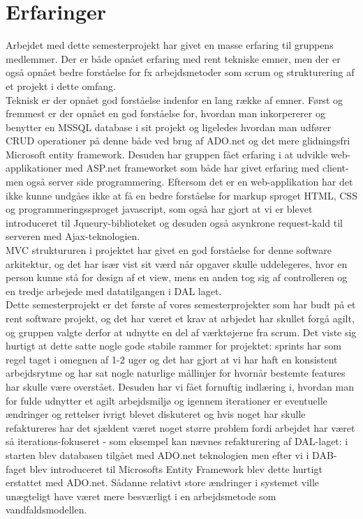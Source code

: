 \section{Erfaringer}
Arbejdet med dette semesterprojekt har givet en masse erfaring til gruppens medlemmer. Der er både opnået erfaring med rent tekniske emner, men der er også opnået bedre forståelse for fx arbejdsmetoder som scrum og strukturering af et projekt i dette omfang.\\
Teknisk er der opnået god forståelse indenfor en lang række af emner. Først og fremmest er der opnået en god forståelse for, hvordan man inkorpererer og benytter en MSSQL database i sit projekt og ligeledes hvordan man udfører CRUD operationer på denne både ved brug af ADO.net og det mere glidningsfri Microsoft entity framework. Desuden har gruppen fået erfaring i at udvikle web-applikationer med ASP.net frameworket som både har givet erfaring med client- men også server side programmering. Eftersom det er en web-applikation har det ikke kunne undgåes ikke at få en bedre forståelse for markup sproget HTML, CSS og programmeringssproget javascript, som også har gjort at vi er blevet introduceret til Jqueury-biblioteket og desuden også asynkrone request-kald til serveren med Ajax-teknologien.\\
MVC struktururen i projektet har givet en god forståelse for denne software arkitektur, og det har især vist sit værd når opgaver skulle uddelegeres, hvor en person kunne stå for design af et view, mens en anden tog sig af controlleren og en tredje arbejede med datatilgangen i DAL laget. 
\\
Dette semesterprojekt er det første af vores semesterprojekter som har budt på et rent software projekt, og det har været et krav at arbjedet har skullet forgå agilt, og gruppen valgte derfor at udnytte en del af værktøjerne fra scrum. Det viste sig hurtigt at dette satte nogle gode stabile rammer for projektet: sprints har som regel taget i omegnen af 1-2 uger og det har gjort at vi har haft en konsistent arbejdsrytme og har sat nogle naturlige mållinjer for hvornår bestemte features har skulle være overstået. Desuden har vi fået fornuftig indlæring i, hvordan man for fulde udnytter et agilt arbejdsmiljø og igennem iterationer er eventuelle ændringer og rettelser ivrigt blevet diskuteret og hvis noget har skulle refaktureres har det sjældent været noget større problem fordi arbejdet har været så iterations-fokuseret - som eksempel kan nævnes refakturering af DAL-laget: i starten blev databasen tilgået med ADO.net teknologien men efter vi i DAB-faget blev introduceret til Microsofts Entity Framework blev dette hurtigt erstattet med ADO.net. Sådanne relativt store ændringer i systemet ville unægteligt have været mere besværligt i en arbejdsmetode som vandfaldsmodellen. \\

